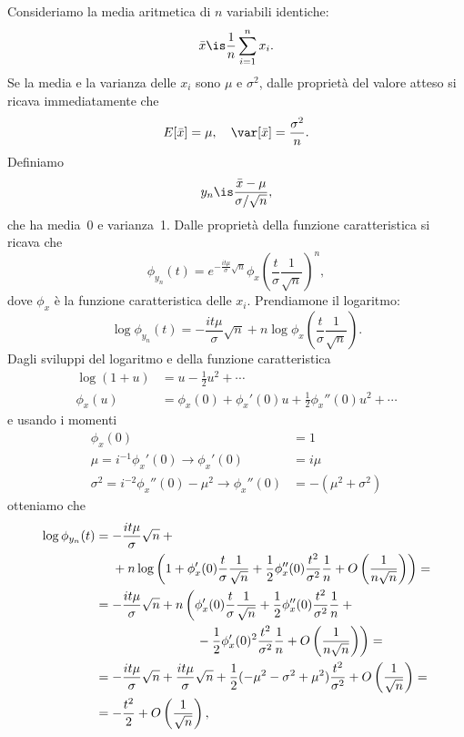 

Consideriamo la media aritmetica di $n$ variabili identiche:
\begin{equation*}
	\bar x \is \frac1n \sum_{i=1}^n x_i.
\end{equation*}
Se la media e la varianza delle $x_i$ sono $\mu$ e $\sigma^2$,
dalle proprietà del valore atteso si ricava immediatamente che
\begin{equation*}
	E[\bar x] = \mu, \quad \var[\bar x] = \frac{\sigma^2}{n}.
\end{equation*}
Definiamo
\begin{equation*}
	y_n \is \frac{\bar x - \mu}{\sigma / \sqrt n},
\end{equation*}
che ha media~0 e varianza~1.
Dalle proprietà della funzione caratteristica si ricava che
\begin{equation*}
	\phi_{y_n}(t) = e^{-\frac{it\mu}{\sigma}\sqrt n} \phi_x\left(\frac t\sigma \frac1{\sqrt n}\right)^n,
\end{equation*}
dove $\phi_x$ è la funzione caratteristica delle $x_i$. Prendiamone il logaritmo:
\begin{equation*}
	\log\phi_{y_n}(t) = -\frac{it\mu}{\sigma}\sqrt n + n\log\phi_x\left(\frac t\sigma \frac1{\sqrt n}\right).
\end{equation*}
Dagli sviluppi del logaritmo e della funzione caratteristica
\begin{align*}
	\log(1+u) &= u - \frac12 u^2 + \dotsb \\
	\phi_x(u) &= \phi_x(0) + \phi_x'(0)u + \frac12 \phi_x''(0) u^2 + \dotsb
\end{align*}
e usando i momenti
\begin{align*}
	\phi_x(0) &= 1 \\
	\mu = i^{-1}\phi_x'(0) \rightarrow \phi_x'(0) &= i\mu \\
	\sigma^2 = i^{-2}\phi_x''(0) - \mu^2 \rightarrow \phi_x''(0) &= -(\mu^2+\sigma^2)
\end{align*}
otteniamo che
\begin{align*}
	\log\phi_{y_n}(t)
	&= -\frac{it\mu}{\sigma}\sqrt n + {} \\
	&\phantom{{}={}} + n \log\left(1 + \phi_x'(0) \frac t\sigma \frac1{\sqrt n}
	+ \frac12 \phi_x''(0) \frac{t^2}{\sigma^2} \frac1n
	+ O\left(\frac1{n\sqrt n}\right) \right) = \\
	&= -\frac{it\mu}{\sigma}\sqrt n
	+ n \left( \phi_x'(0) \frac t\sigma \frac1{\sqrt n}
	+ \frac12 \phi_x''(0) \frac{t^2}{\sigma^2} \frac 1n + {}\right. \\
	&\left.\phantom{= -\frac{it\mu}{\sigma}\sqrt n + n\left(\vphantom{\frac1{\sqrt n}}\right.}
	- \frac12 \phi_x'(0)^2 \frac{t^2}{\sigma^2} \frac 1n 
	+ O\left(\frac1{n\sqrt n}\right) \right) = \\
	&= -\frac{it\mu}{\sigma}\sqrt n
	+ \frac{it\mu}{\sigma}\sqrt n
	+ \frac12 (-\mu^2 - \sigma^2 + \mu^2) \frac{t^2}{\sigma^2} + O\left(\frac1{\sqrt n}\right) = \\
	&= -\frac{t^2}2 + O\left(\frac1{\sqrt n}\right),
\end{align*}
